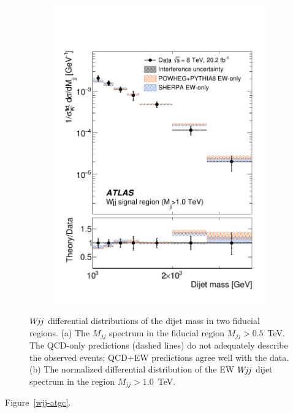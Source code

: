 \documentclass{PoS}
\def\wjj{\ensuremath{W\kern -0.2em j\kern -0.1emj}\xspace}
\def\mjj{\ensuremath{M_{jj}}\xspace}
\begin{document}
\begin{figure}
\begin{subfigure}[t]{0.50\textwidth}
    \caption{}
  \end{subfigure}%
  ~
  \begin{subfigure}[t]{0.50\textwidth}
    \includegraphics[width=.99\textwidth]{STDM-2014-11/fig_19b.pdf}\vspace{-5mm}
    \caption{}
  \end{subfigure}%
  \caption{\wjj differential distributions of the dijet mass in two fiducial regions. (a) The $\mjj$
    spectrum in the fiducial region $\mjj>0.5$~TeV. The QCD-only predictions (dashed lines) do not
    adequately describe the observed events; QCD+EW predictions agree well with the data.
    (b) The normalized differential distribution of the EW \wjj dijet spectrum in the region
    $\mjj>1.0$~TeV.
  }
  \label{wjj-differential-distributions}
\end{figure}

Figure~\ref{wjj-atgc}.
\end{document}
